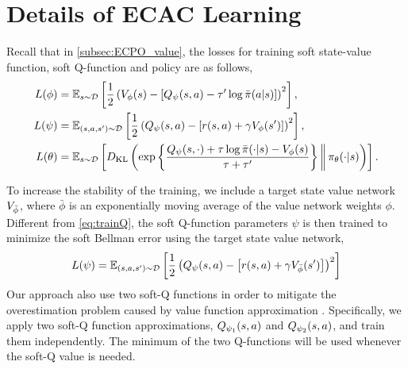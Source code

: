 \section{Details of ECAC Learning}
\label{sec:implementationECAC}

Recall that in \cref{subsec:ECPO_value}, the losses for training soft state-value function, soft Q-function and policy are as follows,
\begin{align}
\label{eq:trainV}
L (\phi) &= \mathbb{E}_{s\sim {\mathcal{D}}} \left[ \frac{1}{2} \left( V_{\phi}(s) -  \left[ Q_{\psi}(s,a ) - \tau' \log \bar{\pi}(a|s) \right] \right)^2 \right], \\
\label{eq:trainQ}
L(\psi) &= \mathbb{E}_{(s,a,s') \sim {\mathcal{D}}} \left[ \frac{1}{2} \left( Q_{\psi}(s,a) - \left[r(s,a) + \gamma V_{\phi}(s') \right] \right)^2 \right], \\
\label{eq:trainpi}
L(\theta)  &= \mathbb{E}_{s \sim {\mathcal{D}}} \left[ D_{\mathrm{KL}} \left( \exp\left\{ \frac{Q_{\psi}(s,\cdot) + \tau \log \bar{\pi}(\cdot|s) - V_{\phi}(s)}{\tau+\tau'} \right\}  \bigg\Vert\, \pi_{\theta}(\cdot | s) \right) \right].
\end{align}

To increase the stability of the training, we include a target state value network $V_{\bar{\phi}}$, where $\bar{\phi}$ is an exponentially moving average of the value network weights $\phi$. 
Different from \cref{eq:trainQ}, the soft Q-function parameters $\psi$ is then trained to minimize the soft Bellman error using the target state value network,
\begin{equation}
L(\psi) = \mathbb{E}_{(s,a,s') \sim {\mathcal{D}}} \left[ \frac{1}{2} \left( Q_{\psi}(s,a) - \left[r(s,a) + \gamma V_{\bar{\phi}}(s') \right] \right)^2 \right]
\end{equation}
Our approach also use two soft-Q functions in order to mitigate the overestimation problem caused by value function approximation \citep{haarnoja2018soft,fujimoto2018addressing}. Specifically, we apply two soft-Q function approximations, $Q_{\psi_1}(s,a)$ and $Q_{\psi_2}(s,a)$, and train them independently.  The minimum of the two Q-functions will be used whenever the soft-Q value is needed. 

